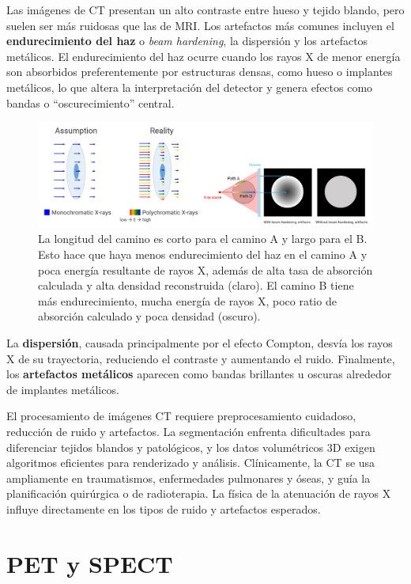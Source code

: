 Las imágenes de CT presentan un alto contraste entre hueso y tejido blando, pero suelen ser más ruidosas que las de MRI. Los artefactos más comunes incluyen el \textbf{endurecimiento del haz} o \textit{beam hardening}, la dispersión y los artefactos metálicos. El endurecimiento del haz ocurre cuando los rayos X de menor energía son absorbidos preferentemente por estructuras densas, como hueso o implantes metálicos, lo que altera la interpretación del detector y genera efectos como bandas o “oscurecimiento” central. 

\begin{figure}[h]
\centering
\includegraphics[width = \textwidth]{figs/beam-hardening.png}
\caption{La longitud del camino es corto para el camino A y largo para el B. Esto hace que haya menos endurecimiento del haz en el camino A y poca energía resultante de rayos X, además de alta tasa de absorción calculada y alta densidad reconstruida (claro). El camino B tiene más endurecimiento, mucha energía de rayos X, poco ratio de absorción calculado y poca densidad (oscuro).}
\end{figure}

La \textbf{dispersión}, causada principalmente por el efecto Compton, desvía los rayos X de su trayectoria, reduciendo el contraste y aumentando el ruido. Finalmente, los \textbf{artefactos metálicos} aparecen como bandas brillantes u oscuras alrededor de implantes metálicos.

El procesamiento de imágenes CT requiere preprocesamiento cuidadoso, reducción de ruido y artefactos. La segmentación enfrenta dificultades para diferenciar tejidos blandos y patológicos, y los datos volumétricos 3D exigen algoritmos eficientes para renderizado y análisis. Clínicamente, la CT se usa ampliamente en traumatismos, enfermedades pulmonares y óseas, y guía la planificación quirúrgica o de radioterapia. La física de la atenuación de rayos X influye directamente en los tipos de ruido y artefactos esperados.

\section{PET y SPECT}

